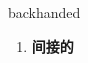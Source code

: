 
\begin{frame}
{\huge backhanded}
\begin{center}
\begin{enumerate}\Large
  \item \textbf{间接的}
\end{enumerate}
\end{center}
\end{frame}
